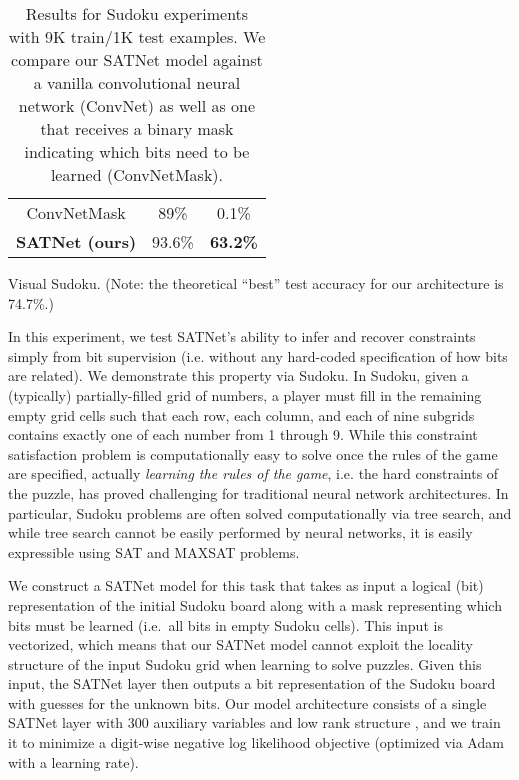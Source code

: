 \documentclass{article}
\begin{document}
\begin{table*}[t!]
\begin{subtable}[t]{0.33\textwidth}
\begin{tabular}{ccc}
ConvNetMask & 89\% & 0.1\% \\
\textbf{SATNet (ours)}  & 93.6\% &  \textbf{63.2\%} \\
	   \bottomrule
	    \end{tabular}
	    \caption{Visual Sudoku. (Note: the theoretical ``best'' test accuracy for our architecture is 74.7\%.)}
	    \end{subtable}
	    \caption{Results for  Sudoku experiments with 9K train/1K test examples. We compare our SATNet model against a vanilla convolutional neural network (ConvNet) as well as one that receives a binary mask indicating which bits need to be learned (ConvNetMask).
	   }
	    \label{tab:sudoku-9}
	\end{table*}
	\endgroup
	
	In this experiment, we test SATNet's ability to infer and recover constraints simply from bit supervision (i.e. without any hard-coded specification of how bits are related).
	We demonstrate this property via 
Sudoku.
	In Sudoku, given a (typically)  partially-filled grid of numbers, a player must fill in the remaining empty grid cells such that each row, each column, and each of nine  subgrids contains exactly one of each number from 1 through 9.
	While this constraint satisfaction problem is computationally easy to solve once the rules of the game are specified, actually \emph{learning the rules of the game}, i.e. the hard constraints of the puzzle, has proved challenging for traditional neural network architectures.
	In particular, Sudoku problems are often solved computationally via tree search, and while tree search cannot be easily performed by neural networks, it is easily expressible 
	using
SAT and MAXSAT problems.
	
	We construct a SATNet model for this task that takes as input a logical (bit) representation of the initial Sudoku board along with a mask representing which bits must be learned (i.e.~all bits in empty Sudoku cells). 
	This input is vectorized, which means that our SATNet model cannot exploit the locality structure of the input Sudoku grid when learning to solve puzzles.
	Given this input, the SATNet layer then outputs a bit representation of the Sudoku board with guesses for the unknown bits.
	Our model architecture consists of a single SATNet layer with 300 auxiliary variables and low rank structure , and we train it to minimize a digit-wise negative log likelihood objective (optimized via Adam with a  learning rate).
	
\end{document}
